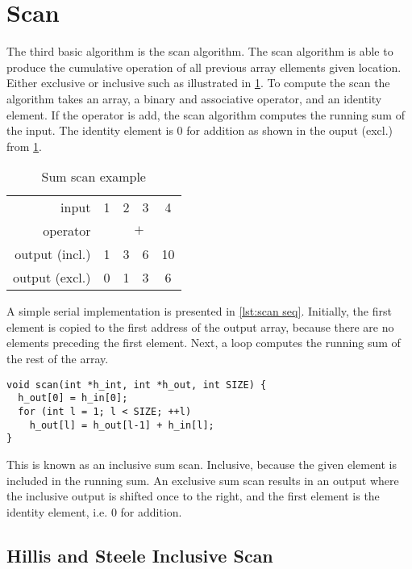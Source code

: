 \section{Scan}
\label{sec:scan}

The third basic algorithm is the scan algorithm.
The scan algorithm is able to produce the cumulative operation of all previous array ellements given location.
Either exclusive or inclusive such as illustrated in \cref{tab:scan example}.
To compute the scan the algorithm takes an array, a binary and associative operator, and an identity element.
If the operator is add, the scan algorithm computes the running sum of the input.
The identity element is 0 for addition as shown in the ouput (excl.) from \cref{tab:scan example}.

\begin{table}[htb]
  \centering
  \begin{tabular}{r | c c c c}
    \toprule
    input & 1 & 2 & 3 & 4 \\
    operator & \multicolumn{4}{c}{$\mathtt{+}$} \\
    output (incl.) & 1 & 3 & 6 & 10 \\
    output (excl.) & 0 & 1 & 3 & 6 \\
    \bottomrule
  \end{tabular}
  \caption{Sum scan example}
  \label{tab:scan example}
\end{table}
    
A simple serial implementation is presented in \cref{lst:scan seq}.
Initially, the first element is copied to the first address of the output array, because there are no elements preceding the first element.
Next, a loop computes the running sum of the rest of the array.

\begin{lstlisting}[caption={Serial scan}, label={lst:scan seq}]
void scan(int *h_int, int *h_out, int SIZE) {
  h_out[0] = h_in[0];
  for (int l = 1; l < SIZE; ++l)
    h_out[l] = h_out[l-1] + h_in[l];
}
\end{lstlisting}

This is known as an inclusive sum scan.
Inclusive, because the given element is included in the running sum.
An exclusive sum scan results in an output where the inclusive output is shifted once to the right, and the first element is the identity element, i.e. 0 for addition.

\subsection{Hillis and Steele Inclusive Scan}
\label{sec:hillis and steele scan}

